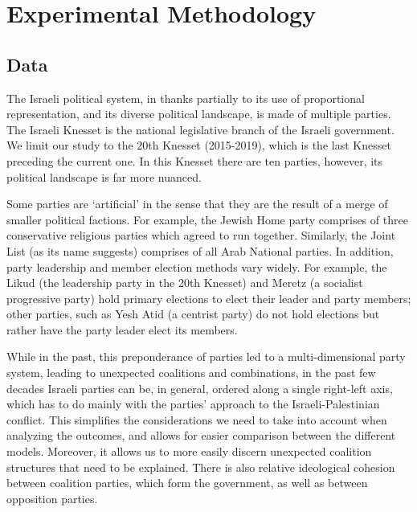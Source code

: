
\chapter{Experimental Methodology}
\label{ch:experiment}
\vspace{2em}

\section{Data}
\label{sec:data}

The Israeli political system, in thanks partially to its use of
proportional representation, and its diverse political landscape, is made of multiple parties.
The Israeli Knesset is the national legislative branch of the Israeli government.
We limit our study to the 20th Knesset (2015-2019), which is the last
Knesset preceding the current one.
In this Knesset there are ten parties, however, its political landscape is far more nuanced.

Some parties are `artificial' in the sense that they are the result of a merge
of smaller political factions.
For example, the Jewish Home party comprises of three conservative religious
parties which agreed to run together.
Similarly, the Joint List (as its name suggests) comprises of all Arab National
parties. 
In addition, party leadership and member election methods vary widely.
For example, the Likud (the leadership party in the 20th Knesset) and Meretz
(a socialist progressive party) hold primary elections to elect their leader
and party members; other parties, such as Yesh Atid (a centrist party) do not
hold elections but rather have the party leader elect its members. 

While in the past, this preponderance of parties led to a multi-dimensional
party system, leading to unexpected coalitions and combinations,
in the past few decades Israeli parties can be, in general,
ordered along a single right-left axis, which has to do mainly with
the parties' approach to the Israeli-Palestinian conflict.
This simplifies the considerations we need to take into account when analyzing
the outcomes, and allows for easier comparison between the different models.
Moreover, it allows us to more easily discern
unexpected coalition structures that need to be explained.
There is also relative ideological cohesion between coalition parties, which
form the government, as well as between opposition parties.

